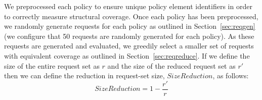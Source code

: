 
We preprocessed each policy to ensure unique policy element
identifiers in order to correctly measure structural coverage. Once
each policy has been preprocessed, we randomly generate requests for
each policy as outlined in Section~\ref{sec:reqgen} (we configure
that 50 requests are randomly generated for each policy). As these
requests are generated and evaluated, we greedily select a smaller
set of requests with equivalent coverage as outlined in
Section~\ref{sec:reqreduce}.  If we define the size of the entire
request set as $r$ and the size of the reduced request set as $r'$
then we can define the reduction in request-set size,
$SizeReduction$, as follows:
\begin{displaymath}
SizeReduction = 1 - \frac{r'}{r}
\end{displaymath}

